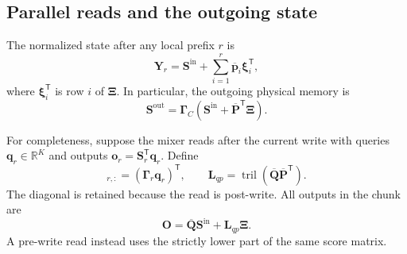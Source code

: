 \documentclass[11pt]{article}
\newcommand{\R}{\mathbb{R}}
\newcommand{\ve}[1]{\boldsymbol{#1}}
\newcommand{\tr}{\mathsf{T}}
\begin{document}
\subsection{Parallel reads and the outgoing state}
\label{app:value-wise-chunk-output}

The normalized state after any local prefix $r$ is
\begin{equation}
  \ve{Y}_r
  =\ve{S}^{\mathrm{in}}
   +\sum_{i=1}^{r}\overline{\ve{p}}_i\ve{\xi}_i^{\tr},
  \label{eq:value-chunk-prefix-state}
\end{equation}
where $\ve{\xi}_i^{\tr}$ is row $i$ of $\ve{\Xi}$.  In particular, the outgoing physical memory is
\begin{equation}
  \ve{S}^{\mathrm{out}}
  =\ve{\Gamma}_C
   \left(
     \ve{S}^{\mathrm{in}}+\overline{\ve{P}}^{\tr}\ve{\Xi}
   \right).
  \label{eq:value-chunk-outgoing-state}
\end{equation}

For completeness, suppose the mixer reads after the current write with queries
$\ve{q}_r\in\R^K$ and outputs $\ve{o}_r=\ve{S}_r^{\tr}\ve{q}_r$.  Define
\begin{equation}
  [\overline{\ve{Q}}]_{r,:}
  =(\ve{\Gamma}_r\ve{q}_r)^{\tr},
  \qquad
  \ve{L}_{qp}
  =\operatorname{tril}
   (\overline{\ve{Q}}\overline{\ve{P}}^{\tr}).
  \label{eq:value-chunk-query-scores}
\end{equation}
The diagonal is retained because the read is post-write.  All outputs in the chunk are
\begin{equation}
  \ve{O}
  =\overline{\ve{Q}}\ve{S}^{\mathrm{in}}
   +\ve{L}_{qp}\ve{\Xi}.
  \label{eq:value-chunk-outputs}
\end{equation}
A pre-write read instead uses the strictly lower part of the same score matrix.
\end{document}
